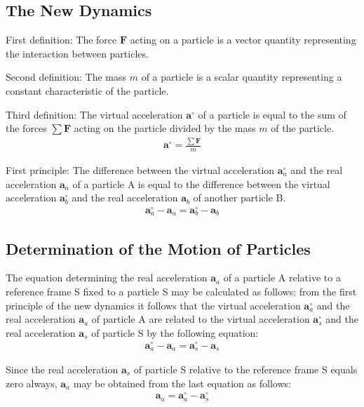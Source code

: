 \documentclass[11pt]{article}
\newcommand{\vA}{\mathbf{a}}
\newcommand{\vF}{\mathbf{F}}
\newcommand{\mM}{m}
\newcommand{\ra}{_a}
\newcommand{\rb}{_b}
\newcommand{\rs}{_s}
\begin{document}
\newpage

{\centering\subsection*{The New Dynamics}}

\par First definition: The force $\vF$ acting on a particle is a vector quantity representing the interaction between particles.
\bigskip \bigskip
\par Second definition: The mass $\mM$ of a particle is a scalar quantity representing a constant characteristic of the particle.
\bigskip \bigskip
\par Third definition: The virtual acceleration $\vA^{\circ}$ of a particle is equal to the sum of the forces $\sum \vF$ acting on the particle divided by the mass $\mM$ of the particle.
\begin{eqnarray*}
\vA^{\circ} = \frac{\sum \vF}{\mM}
\end{eqnarray*}
\par First principle: The difference between the virtual acceleration $\vA^{\circ}\ra$ and the real acceleration $\vA\ra$ of a particle A is equal to the difference between the virtual acceleration $\vA^{\circ}\rb$ and the real acceleration $\vA\rb$ of another particle B.
\begin{eqnarray*}
\vA^{\circ}\ra - \vA\ra = \vA^{\circ}\rb - \vA\rb
\end{eqnarray*}

\medskip

{\centering\subsection*{Determination of the Motion of Particles}}

\par The equation determining the real acceleration $\vA\ra$ of a particle A relative to a reference frame S fixed to a particle S may be calculated as follows: from the first principle of the new dynamics it follows that the virtual acceleration $\vA^{\circ}\ra$ and the real acceleration $\vA\ra$ of particle A are related to the virtual acceleration $\vA^{\circ}\rs$ and the real acceleration $\vA\rs$ of particle S by the following equation:
\begin{eqnarray*}
\vA^{\circ}\ra - \vA\ra = \vA^{\circ}\rs - \vA\rs
\end{eqnarray*}
\par Since the real acceleration $\vA\rs$ of particle S relative to the reference frame S equals zero always, $\vA\ra$ may be obtained from the last equation as follows:
\begin{eqnarray*}
\vA\ra = \vA^{\circ}\ra - \vA^{\circ}\rs
\end{eqnarray*}
\end{document}
